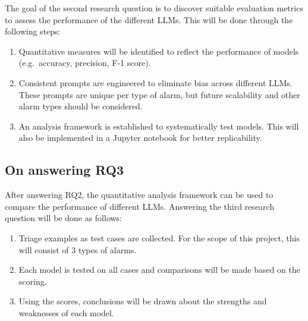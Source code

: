 The goal of the second research question is to discover suitable evaluation metrics to assess the performance of the
different LLMs.
This will be done through the following steps:

\begin{enumerate}
    \item Quantitative measures will be identified to reflect the performance of models (e.g.\ accuracy, precision,
    F-1 score).
    \item Consistent prompts are engineered to eliminate bias across different LLMs.
    These prompts are unique per type of alarm, but future scalability and other alarm types should be considered.
    \item An analysis framework is established to systematically test models.
    This will also be implemented in a Jupyter notebook for better replicability.
\end{enumerate}


\subsection{On answering RQ3}
\label{subsec:on-answering-rq3}
After answering RQ2, the quantitative analysis framework can be used to compare the performance of different LLMs.
Answering the third research question will be done as follows:

\begin{enumerate}
    \item Triage examples as test cases are collected.
    For the scope of this project, this will consist of 3 types of alarms.
    \item Each model is tested on all cases and comparisons will be made based on the scoring.
    \item Using the scores, conclusions will be drawn about the strengths and weaknesses of each model.
\end{enumerate}

%
